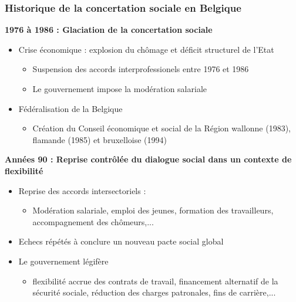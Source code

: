\documentclass[12pt]{beamer}
\begin{document}
  \begin{frame}
    \frametitle{Historique de la concertation sociale en Belgique}
    \textbf{1976 à 1986 : Glaciation de la concertation sociale}
    
    \begin{itemize}
     \item Crise économique : explosion du chômage et déficit structurel de l'Etat
	\begin{itemize}
	 \item Suspension des accords interprofessionels entre 1976 et 1986
	 \item Le gouvernement impose la modération salariale
	\end{itemize}
     \item Fédéralisation de la Belgique
	\begin{itemize}
	 \item Création du Conseil économique et social de la Région wallonne (1983), flamande (1985) et bruxelloise (1994)
	\end{itemize}
    \end{itemize}
    
   \textbf{Années 90 : Reprise contrôlée du dialogue social dans un contexte de flexibilité}
   
   \begin{itemize}
    \item Reprise des accords intersectoriels :
      \begin{itemize}
       \item Modération salariale, emploi des jeunes, formation des travailleurs, accompagnement des chômeurs,...
      \end{itemize}
    \item Echecs répétés à conclure un nouveau pacte social global
    \item Le gouvernement légifère
      \begin{itemize}
       \item flexibilité accrue des contrats de travail, financement alternatif de la sécurité sociale, réduction des charges patronales, fins de carrière,...
      \end{itemize}
   \end{itemize}
    
  \end{frame}
  
\end{document}
